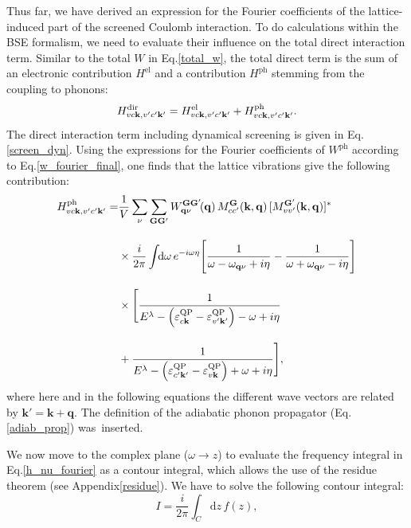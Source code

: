 Thus far, we have derived an expression for the Fourier coefficients of the lattice-induced part of the screened Coulomb interaction. To do calculations within the BSE formalism, we need to evaluate their influence on the total direct interaction term. Similar to the total $W$ in Eq.\;\eqref{total_w}, the total direct term is the sum of an electronic  contribution $H^\text{el}$ and  a contribution $H^\text{ph}$ stemming from the coupling to phonons:
%
\begin{equation}\label{hdir_tot}
    H^\text{dir}_{vc\mathbf{k},v'c'\mathbf{k}'} = H^\text{el}_{vc\mathbf{k},v'c'\mathbf{k}'} + H^\text{ph}_{vc\mathbf{k},v'c'\mathbf{k}'}.
\end{equation}
%
\newpage
The direct interaction term including dynamical screening is given in Eq.\;\eqref{screen_dyn}. Using the expressions for the Fourier coefficients of $W^\text{ph}$ according to Eq.\;\eqref{w_fourier_final}, one finds that the lattice vibrations give the following contribution:
%
\begin{equation}
\begin{aligned}\label{h_nu_fourier}
    H^\text{ph}_{vc\mathbf{k},v'c'\mathbf{k}'}  = &  \frac{1}{V}\sum_\nu\sum_{\mathbf{GG'}}  W_{\mathbf{q}\nu}^{\mathbf{G}\mathbf{G}'}\!(\mathbf{q})\,M^{\mathbf{G}}_{cc'}(\mathbf{k,q})\,[M^\mathbf{G'}_{vv'}(\mathbf{k,q})]^*\\[10pt]
     & \times \frac{i}{2\pi}\int\text{\!\!d}\omega\,e^{-i\omega\eta}  \Biggl[\frac{1}{\omega - \omega_{\mathbf{q}\nu} + i\eta} - \frac{1}{\omega + \omega_{\mathbf{q}\nu} - i\eta}\Biggr] \\[10pt]
     & \times \Biggl[\frac{1}{  E^\lambda - \left(\varepsilon^\text{QP}_{c\mathbf{k}} - \varepsilon^\text{QP}_{v'\mathbf{k'}}\right)  - \omega + i\eta } \\[10pt]
     & + \frac{1}{ E^\lambda - \left(\varepsilon^\text{QP}_{c'\mathbf{k'}} - \varepsilon^\text{QP}_{v\mathbf{k}}\right) + \omega +  i\eta}\Biggr],
\end{aligned}
\end{equation}
where here and in the following equations the different wave vectors are related by $\mathbf{k'=k+q}$.
The definition of the adiabatic phonon propagator (Eq.\;\eqref{adiab_prop}) was~inserted.\par
\noindent We now move to the complex plane ($\omega\rightarrow z$) to evaluate the frequency integral in Eq.\;\eqref{h_nu_fourier} as a contour integral, which allows the use of the residue theorem (see Appendix\;\ref{residue}). We have to solve the following contour integral:
%
\begin{equation}
         I =  \frac{i}{2\pi}\int_C\text{d}z\,f(z),
\end{equation}
